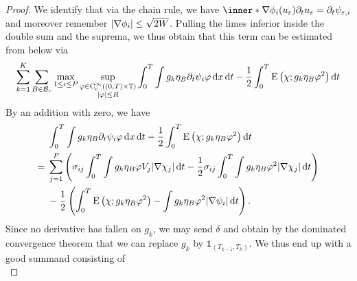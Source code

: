 \begin{proof}
\begin{comment}
	\dd{ t } 
	\\
	& \qquad \qquad \qquad \qquad \qquad \qquad \quad 
	\:\, -
	\frac{ 1 }{ 2 }
	\int_{ 0 }^{ T }
	\int
	g_{ k } \eta_{ B }
	\frac{ 1 }{ \varepsilon }
	2 W ( u_{ \varepsilon } )
	\varphi^{ 2 }
	\dd{ x }
	\dd{ t }
\end{comment}
	We identify that via the chain rule, we have $ \inner*{ \nabla \phi_{ i } ( 
	u_{ \varepsilon } ) }{ \partial_{ t } u_{ \varepsilon } } = \partial_{ t } 
	\psi_{ \varepsilon , i } $ and moreover remember $ \abs{ \nabla \phi_{ i } 
	} \leq \sqrt{ 2 W } $.
	Pulling the limes inferior inside the double sum and the suprema, we thus 
	obtain 
	that this term can be estimated from below via
	\begin{equation*}\sum_{ k = 1 }^{ K }
		\sum_{ B \in \mathcal{ B }_{ r } }
		\max_{ 1 \leq i \leq P }
		\sup_{ 
			\substack{ 
				\varphi \in \operatorname{C}_{ \mathrm{c} }^{ \infty } 
				\left( ( 0 , T ) \times \operatorname{\mathbb{T}} \right)
				\\
				\abs{ \varphi } \leq R  
			}
		}
		\int_{ 0 }^{ T }
		\int
		g_{ k } \eta_{ B }
		\partial_{ t } \psi_{ i }
		\varphi
		\dd{ x }
		\dd{ t } 
		-
		\frac{ 1 }{ 2 }
		\int_{ 0 }^{ T }
		\operatorname{E} \left( \chi ; g_{ k } \eta_{ B } \varphi^{ 2 } \right)
		\dd{ t }
		\end{equation*}
		By an addition with zero, we have
		\begin{align*}
		& \int_{ 0 }^{ T }
		\int
		g_{ k } \eta_{ B }
		\partial_{ t } \psi_{ i }
		\varphi
		\dd{ x }
		\dd{ t } 
		-
		\frac{ 1 }{ 2 }
		\int_{ 0 }^{ T }
		\operatorname{E} \left( \chi ; g_{ k } \eta_{ B } \varphi^{ 2 } \right)
		\dd{ t }
		\\
		={}&
		\sum_{ j = 1 }^{ P }
		\left(
		\sigma_{ i j }
		\int_{ 0 }^{ T }
		\int
		g_{ k } \eta_{ B }
		\varphi
		V_{ j }
		\abs{ \nabla \chi_{ j } }
		\dd{ t } 
		-
		\frac{ 1 }{ 2 }
		\sigma_{ i j }
		\int_{ 0 }^{ T }
			\int
				g_{ k } \eta_{ B }
				\varphi^{ 2 }
			\abs{ \nabla \chi_{ j } }
		\dd{ t }
		\right)\\
		& 
		-\frac{ 1 }{ 2 }
		\left(
		\int_{ 0 }^{ T }
		\operatorname{E} \left( \chi ; g_{ k } \eta_{ B } \varphi^{ 2 } \right)
		-
		\int
			g_{ k } \eta_{ B }
			\varphi^{ 2 }
			\abs{ \nabla \psi_{ i } }
		\dd{ t }
		\right).
	\end{align*}
	Since no derivative has fallen on $ g_{ k } $, we may send $ \delta $ and 
	obtain by the dominated convergence theorem that we can replace $ g_{ k } $ 
	by $ \mathds{ 1 }_{ ( T_{ k - 1 } , T_{ k } ) } $. We thus end up with a 
	good summand consisting of
	\begin{equation}

\end{equation}
\end{proof}
